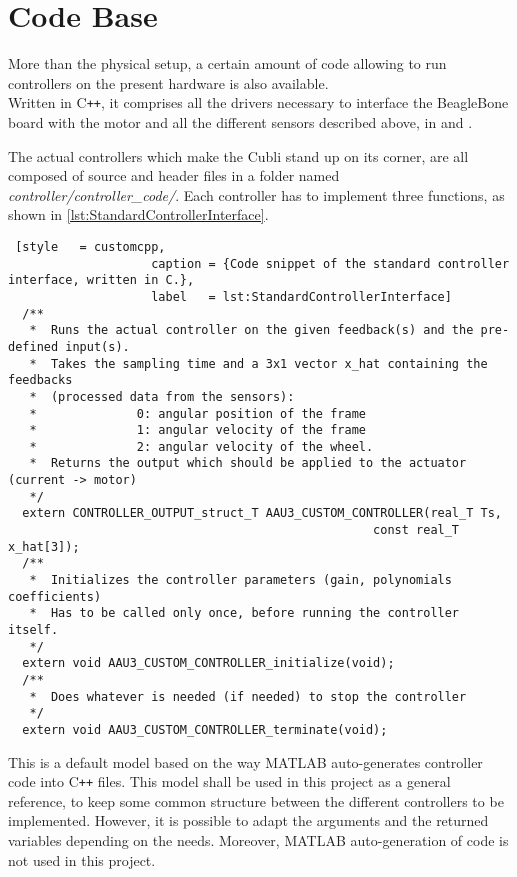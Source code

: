 \section{Code Base}\label{sec:codeBase}
More than the physical setup, a certain amount of code allowing to run controllers on the present hardware is also available. \\
Written in C\texttt{++}, it comprises all the drivers necessary to interface the BeagleBone board with the motor and all the different sensors described above, in  and .

The actual controllers which make the Cubli stand up on its corner, are all composed of source and header files in a folder named \textit{controller/controller\_code/}. Each controller has to implement three functions, as shown in \autoref{lst:StandardControllerInterface}.
%
\begin{lstlisting} [style   = customcpp,
                    caption = {Code snippet of the standard controller interface, written in C.}, 
                    label   = lst:StandardControllerInterface]
  /**
   *  Runs the actual controller on the given feedback(s) and the pre-defined input(s).
   *  Takes the sampling time and a 3x1 vector x_hat containing the feedbacks 
   *  (processed data from the sensors):
   *              0: angular position of the frame
   *              1: angular velocity of the frame
   *              2: angular velocity of the wheel.
   *  Returns the output which should be applied to the actuator (current -> motor)
   */
  extern CONTROLLER_OUTPUT_struct_T AAU3_CUSTOM_CONTROLLER(real_T Ts, 
                                                   const real_T x_hat[3]);
  /**
   *  Initializes the controller parameters (gain, polynomials coefficients)
   *  Has to be called only once, before running the controller itself.
   */
  extern void AAU3_CUSTOM_CONTROLLER_initialize(void);
  /**
   *  Does whatever is needed (if needed) to stop the controller
   */
  extern void AAU3_CUSTOM_CONTROLLER_terminate(void);

\end{lstlisting}
This is a default model based on the way MATLAB auto-generates controller code into C\texttt{++} files. This model shall be used in this project as a general reference, to keep some common structure between the different controllers to be implemented. However, it is possible to adapt the arguments and the returned variables depending on the needs. Moreover, MATLAB auto-generation of code is not used in this project.

